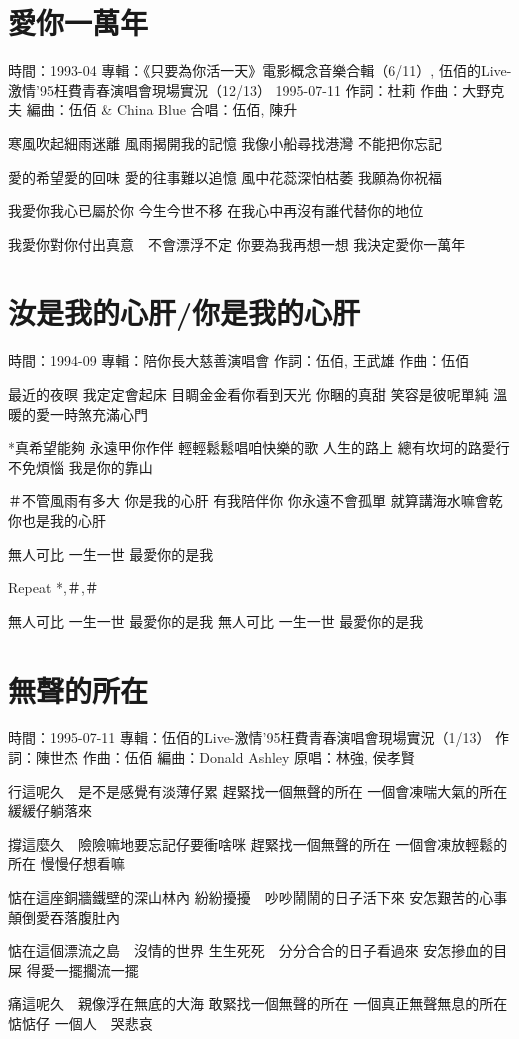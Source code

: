 \documentclass[UTF8,a4paper,oneside,twocolumn,12pt]{ctexbook}
\newcommand{\infopair}[2]{\textbullet #1：#2}
\newcommand{\zc}[1][伍佰]{\infopair{作詞}{#1}}
\newcommand{\zq}[1][伍佰]{\infopair{作曲}{#1}}
\newcommand{\bq}[1][伍佰]{\infopair{編曲}{#1}}
\newcommand{\zj}[1]{\infopair{專輯}{#1}}
\newcommand{\yc}[1]{\infopair{原唱}{#1}}
\newcommand{\sj}[1]{\infopair{時間}{#1}}
\newenvironment{info}{\begin{flushleft}\kaishu
	}
	{\end{flushleft}\normalsize\yahei\par}
\newenvironment{lyric}{
	}
{}
\begin{document}
\section{愛你一萬年}
\begin{info}
	\sj{1993-04}
	\zj{《只要為你活一天》電影概念音樂合輯（6/11）, 伍佰的Live-激情'95枉費青春演唱會現場實況（12/13） 1995-07-11}
	\zc[杜莉]
	\zq[大野克夫]
	\bq[伍佰 \& China Blue]
	\infopair{合唱}{伍佰, 陳升}
\end{info}
\begin{lyric}
	寒風吹起細雨迷離
	風雨揭開我的記憶
	我像小船尋找港灣
	不能把你忘記

	愛的希望愛的回味
	愛的往事難以追憶
	風中花蕊深怕枯萎
	我願為你祝福

	我愛你我心已屬於你
	今生今世不移
	在我心中再沒有誰代替你的地位

	我愛你對你付出真意　不會漂浮不定
	你要為我再想一想
	我決定愛你一萬年
\end{lyric}

\section{汝是我的心肝/你是我的心肝}
\begin{info}
	\sj{1994-09}
	\zj{陪你長大慈善演唱會}
	\zc[伍佰, 王武雄]
	\zq
\end{info}
\begin{lyric}
	最近的夜暝 我定定會起床 目睭金金看你看到天光
	你睏的真甜 笑容是彼呢單純 溫暖的愛一時煞充滿心門

	*真希望能夠 永遠甲你作伴 輕輕鬆鬆唱咱快樂的歌
	人生的路上 總有坎坷的路愛行 不免煩惱 我是你的靠山

	＃不管風雨有多大 你是我的心肝 有我陪伴你 你永遠不會孤單
	就算講海水嘛會乾 你也是我的心肝

	無人可比 一生一世 最愛你的是我

	Repeat *,＃,＃

	無人可比 一生一世 最愛你的是我
	無人可比 一生一世 最愛你的是我
\end{lyric}

\section{無聲的所在}
\begin{info}
	\sj{1995-07-11}
	\zj{伍佰的Live-激情'95枉費青春演唱會現場實況（1/13）}
	\zc[陳世杰]
	\zq
	\bq[Donald Ashley]
	\yc{林強, 侯孝賢}
\end{info}
\begin{lyric}
	行這呢久　是不是感覺有淡薄仔累
	趕緊找一個無聲的所在
	一個會凍喘大氣的所在
	緩緩仔躺落來

	撐這麼久　險險嘛地要忘記仔要衝啥咪
	趕緊找一個無聲的所在
	一個會凍放輕鬆的所在
	慢慢仔想看嘛

	惦在這座銅牆鐵壁的深山林內
	紛紛擾擾　吵吵鬧鬧的日子活下來
	安怎艱苦的心事　顛倒愛吞落腹肚內

	惦在這個漂流之島　沒情的世界
	生生死死　分分合合的日子看過來
	安怎摻血的目屎
	得愛一擺擱流一擺

	痛這呢久　親像浮在無底的大海
	敢緊找一個無聲的所在
	一個真正無聲無息的所在
	惦惦仔  一個人　哭悲哀
\end{lyric}
\end{document}
